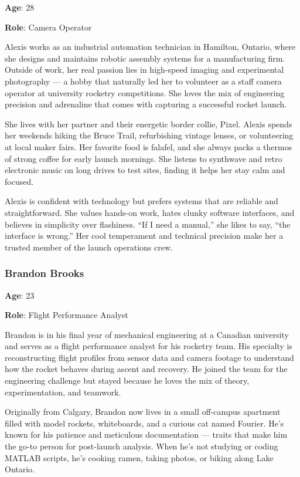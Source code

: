 \documentclass[12pt]{article}
\begin{document}
\textbf{Age}: 28

\textbf{Role}: Camera Operator

Alexis works as an industrial automation technician in Hamilton, Ontario, where
she designs and maintains robotic assembly systems for a manufacturing firm.
Outside of work, her real passion lies in high-speed imaging and experimental
photography — a hobby that naturally led her to volunteer as a staff camera
operator at university rocketry competitions. She loves the mix of engineering
precision and adrenaline that comes with capturing a successful rocket launch.

She lives with her partner and their energetic border collie, Pixel. Alexis
spends her weekends hiking the Bruce Trail, refurbishing vintage lenses, or
volunteering at local maker fairs. Her favorite food is falafel, and she always
packs a thermos of strong coffee for early launch mornings. She listens to
synthwave and retro electronic music on long drives to test sites, finding it
helps her stay calm and focused.

Alexis is confident with technology but prefers systems that are reliable and
straightforward. She values hands-on work, hates clunky software interfaces,
and believes in simplicity over flashiness. “If I need a manual,” she likes to
say, “the interface is wrong.” Her cool temperament and technical precision
make her a trusted member of the launch operations crew.

\subsubsection*{Brandon Brooks}

\textbf{Age}: 23

\textbf{Role}: Flight Performance Analyst

Brandon is in his final year of mechanical engineering at a Canadian university
and serves as a flight performance analyst for his rocketry team. His specialty
is reconstructing flight profiles from sensor data and camera footage to
understand how the rocket behaves during ascent and recovery. He joined the
team for the engineering challenge but stayed because he loves the mix of
theory, experimentation, and teamwork.

Originally from Calgary, Brandon now lives in a small off-campus apartment
filled with model rockets, whiteboards, and a curious cat named Fourier. He’s
known for his patience and meticulous documentation — traits that make him the
go-to person for post-launch analysis. When he’s not studying or coding MATLAB
scripts, he’s cooking ramen, taking photos, or biking along Lake Ontario.
\end{document}
